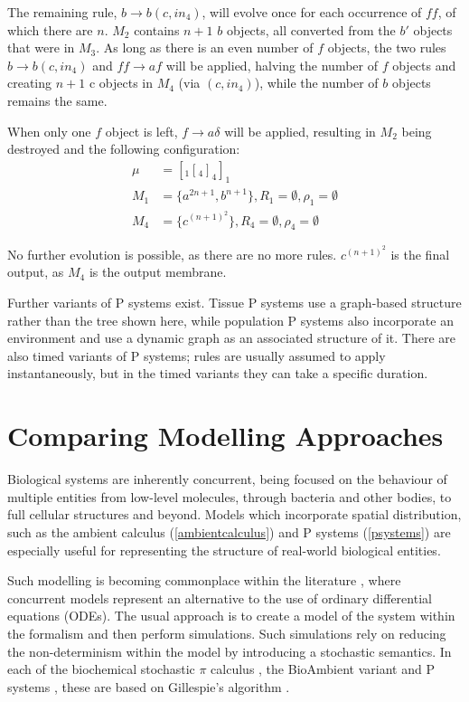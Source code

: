 The remaining rule, $b \rightarrow b(c, in_4)$, will evolve once for
each occurrence of $ff$, of which there are $n$.  $M_2$ contains $n + 1$
$b$ objects, all converted from the $b'$ objects that were in $M_3$.  As
long as there is an even number of $f$ objects, the two rules $b
\rightarrow b(c, in_4)$ and $ff \rightarrow af$ will be applied, halving
the number of $f$ objects and creating $n + 1$ c objects in $M_4$ (via
$(c, in_4)$), while the number of $b$ objects remains the same.

When only one $f$ object is left, $f \rightarrow a\delta$ will be
applied, resulting in $M_2$ being destroyed and the following
configuration:
\begin{align*}
\mu & = [_1[_4]_4]_1 \\
M_1 & = \{a^{2n+1},b^{n+1}\}, 
R_1 = \emptyset,
\rho_1 = \emptyset \\
M_4 & = \{c^{(n+1)^2}\},
R_4 = \emptyset,
\rho_4 = \emptyset
\end{align*}

\noindent No further evolution is possible, as there are no more rules.
$c^{(n+1)^2}$ is the final output, as $M_4$ is the output membrane.

Further variants of P systems exist.  Tissue P systems use a
graph-based structure rather than the tree shown here, while
population P systems also incorporate an environment and use a dynamic
graph as an associated structure of it.  There are also timed variants
of P systems; rules are usually assumed to apply instantaneously, but
in the timed variants they can take a specific duration.

\section{Comparing Modelling Approaches}
\label{bioapps}

Biological systems are inherently concurrent, being focused on the
behaviour of multiple entities from low-level molecules, through
bacteria and other bodies, to full cellular structures and beyond.
Models which incorporate spatial distribution, such as the ambient
calculus (\ref{ambientcalculus}) and P systems (\ref{psystems}) are
especially useful for representing the structure of real-world
biological entities.

Such modelling is becoming commonplace within the literature
 \cite*{biospi,cardelli:bioambients,fran}, where concurrent models
represent an alternative to the use of ordinary differential equations
(ODEs).  The usual approach is to create a model of the system within
the formalism and then perform simulations.  Such simulations rely on
reducing the non-determinism within the model by introducing a
stochastic semantics.  In each of the biochemical stochastic $\pi$
calculus \cite{biospi}, the BioAmbient variant
\cite{cardelli:bioambients} and P systems \cite{fran}, these are based
on Gillespie's algorithm \cite{gillespie}.

